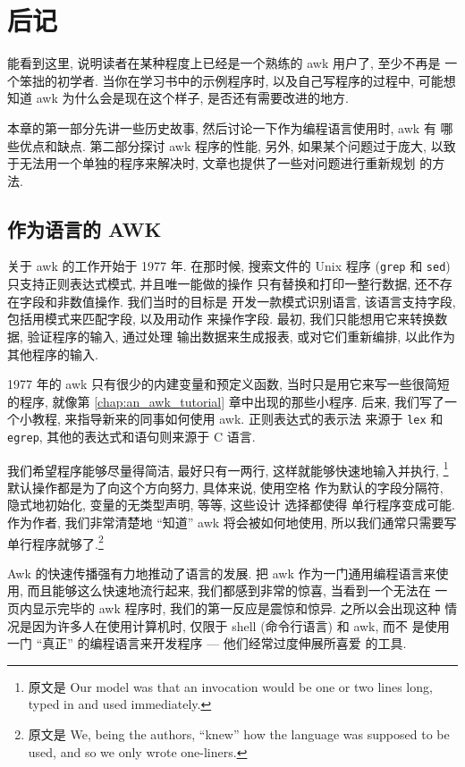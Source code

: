 \chapter{后记}
\label{chap:epilog}

能看到这里, 说明读者在某种程度上已经是一个熟练的 awk 用户了, 至少不再是
一个笨拙的初学者. 当你在学习书中的示例程序时, 以及自己写程序的过程中, 
可能想知道 awk 为什么会是现在这个样子, 是否还有需要改进的地方.

本章的第一部分先讲一些历史故事, 然后讨论一下作为编程语言使用时, awk 有
哪些优点和缺点. 第二部分探讨 awk 程序的性能, 另外, 如果某个问题过于庞大,
以致于无法用一个单独的程序来解决时, 文章也提供了一些对问题进行重新规划
的方法.

\section{作为语言的 AWK}
\label{sec:awk_as_a_language}

关于 awk 的工作开始于 1977 年. 在那时候, 搜索文件的 Unix 程序
(\texttt{grep} 和 \texttt{sed}) 只支持正则表达式模式, 并且唯一能做的操作
只有替换和打印一整行数据, 还不存在字段和非数值操作. 我们当时的目标是
开发一款模式识别语言, 该语言支持字段, 包括用模式来匹配字段, 以及用动作
来操作字段. 最初, 我们只能想用它来转换数据, 验证程序的输入, 通过处理
输出数据来生成报表, 或对它们重新编排, 以此作为其他程序的输入.

1977 年的 awk 只有很少的内建变量和预定义函数, 当时只是用它来写一些很简短
的程序, 就像第 \ref{chap:an_awk_tutorial} 章中出现的那些小程序. 后来,
我们写了一个小教程, 来指导新来的同事如何使用 awk. 正则表达式的表示法
来源于 \texttt{lex} 和 \texttt{egrep}, 其他的表达式和语句则来源于 C
语言.

我们希望程序能够尽量得简洁, 最好只有一两行, 这样就能够快速地输入并执行,
\footnote{ 原文是 Our model was that an invocation would be one or two
    lines long, typed in and used immediately.}
    默认操作都是为了向这个方向努力, 具体来说, 使用空格
作为默认的字段分隔符, 隐式地初始化, 变量的无类型声明, 等等, 这些设计
选择都使得 单行程序变成可能. 作为作者, 我们非常清楚地 ``知道'' awk
将会被如何地使用, 所以我们通常只需要写单行程序就够了.\footnote{原文是 We,
    being the authors, ``knew'' how the language was supposed to be used,
    and so we only wrote one-liners.}

Awk 的快速传播强有力地推动了语言的发展. 把 awk 作为一门通用编程语言来使用,
而且能够这么快速地流行起来, 我们都感到非常的惊喜, 当看到一个无法在
一页内显示完毕的 awk 程序时, 我们的第一反应是震惊和惊异. 之所以会出现这种
情况是因为许多人在使用计算机时, 仅限于 shell (命令行语言) 和 awk, 而不
是使用一门 ``真正'' 的编程语言来开发程序 --- 他们经常过度伸展所喜爱
的工具.

